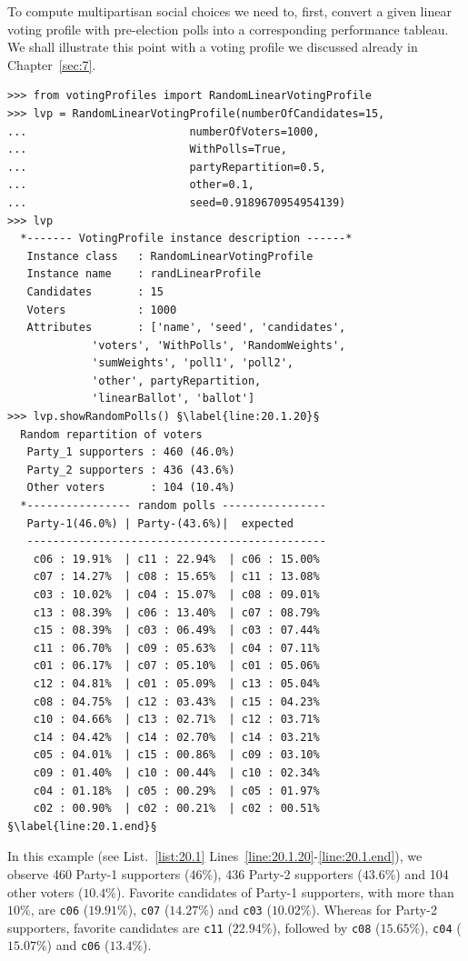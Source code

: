 To compute multipartisan social choices we need to, first, convert a given linear voting profile with pre-election polls into a corresponding performance tableau. We shall illustrate this point with a voting profile we discussed already in Chapter~\ref{sec:7}.
\begin{lstlisting}[caption={Example of a 3 parties voting profile},label=list:20.1]
>>> from votingProfiles import RandomLinearVotingProfile
>>> lvp = RandomLinearVotingProfile(numberOfCandidates=15,
...                         numberOfVoters=1000,
...                         WithPolls=True,
...                         partyRepartition=0.5,
...                         other=0.1,
...                         seed=0.9189670954954139)
>>> lvp
  *------- VotingProfile instance description ------*
   Instance class   : RandomLinearVotingProfile
   Instance name    : randLinearProfile
   Candidates       : 15
   Voters           : 1000
   Attributes       : ['name', 'seed', 'candidates',
             'voters', 'WithPolls', 'RandomWeights',
             'sumWeights', 'poll1', 'poll2',
             'other', partyRepartition,
             'linearBallot', 'ballot']
>>> lvp.showRandomPolls() §\label{line:20.1.20}§
  Random repartition of voters
   Party_1 supporters : 460 (46.0%)
   Party_2 supporters : 436 (43.6%)
   Other voters       : 104 (10.4%)
  *---------------- random polls ----------------
   Party-1(46.0%) | Party-(43.6%)|  expected  
   ----------------------------------------------
    c06 : 19.91%  | c11 : 22.94%  | c06 : 15.00%
    c07 : 14.27%  | c08 : 15.65%  | c11 : 13.08%
    c03 : 10.02%  | c04 : 15.07%  | c08 : 09.01%
    c13 : 08.39%  | c06 : 13.40%  | c07 : 08.79%
    c15 : 08.39%  | c03 : 06.49%  | c03 : 07.44%
    c11 : 06.70%  | c09 : 05.63%  | c04 : 07.11%
    c01 : 06.17%  | c07 : 05.10%  | c01 : 05.06%
    c12 : 04.81%  | c01 : 05.09%  | c13 : 05.04%
    c08 : 04.75%  | c12 : 03.43%  | c15 : 04.23%
    c10 : 04.66%  | c13 : 02.71%  | c12 : 03.71%
    c14 : 04.42%  | c14 : 02.70%  | c14 : 03.21%
    c05 : 04.01%  | c15 : 00.86%  | c09 : 03.10%
    c09 : 01.40%  | c10 : 00.44%  | c10 : 02.34%
    c04 : 01.18%  | c05 : 00.29%  | c05 : 01.97%
    c02 : 00.90%  | c02 : 00.21%  | c02 : 00.51% §\label{line:20.1.end}§
\end{lstlisting}

In this example (see List.~\vref{list:20.1} Lines~\ref{line:20.1.20}-\ref{line:20.1.end}), we observe 460 Party-1 supporters ($46\%$), 436 Party-2 supporters ($43.6\%$) and 104 other voters ($10.4\%$). Favorite candidates of Party-1 supporters, with more than $10\%$, are \texttt{c06} ($19.91\%$), \texttt{c07} ($14.27\%$) and \texttt{c03} ($10.02\%$). Whereas for Party-2 supporters, favorite candidates are \texttt{c11} ($22.94\%$), followed by \texttt{c08} ($15.65\%$), \texttt{c04} ($15.07\%$) and \texttt{c06} ($13.4\%$).

